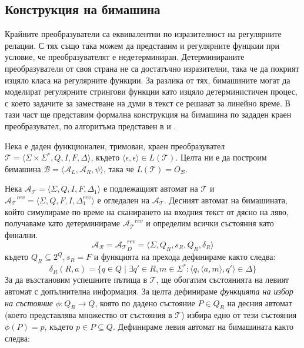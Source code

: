 \documentclass[12pt, oneside]{article}
\theoremstyle{definition}
\begin{document}
\subsection{Конструкция на бимашина}

Крайните преобразуватели са еквивалентни по изразителност на регулярните релации. С тях също така можем да представим и регулярните фунцкии при условие, че преобразувателят е недетерминиран. Детерминираните преобразуватели от своя страна не са достатъчно изразителни, така че да покрият изцяло класа на регулярните функции. За разлика от тях, бимашините могат да моделират регулярните стрингови функции \cite{Schutzenberger:61} като изцяло детерминистичен процес, с което задачите за заместване на думи в текст се решават за линейно време. В тази част ще представим формална конструкция на бимашина по зададен краен преобразувател, по алгоритъма представен в \cite{GerdjikovEtAl:2017} и \cite{Mihov:2018-2}.

Нека е даден функционален, тримован, краен преобразувател \( \mathcal{T} = \langle \Sigma \times \Sigma^*, Q, I, F, \Delta \rangle \), където \( \langle \epsilon, \epsilon \rangle \in L(\mathcal{T}) \). Целта ни е да построим бимашина \( \mathcal{B} = \langle \mathcal{A}_L, \mathcal{A}_R, \psi \rangle \), така че \( L(\mathcal{T}) = O_\mathcal{B} \).

Нека \( \mathcal{A_T} = \langle \Sigma, Q, I, F, \Delta_1 \rangle \) е подлежащият автомат на \( \mathcal{T} \) и \( \mathcal{A_T}^{rev} = \langle \Sigma, Q, F, I, \Delta_1^{rev} \rangle \) е огледален на \( \mathcal{A_T} \). Десният автомат на бимашината, който симулираме по време на сканирането на входния текст от дясно на ляво, получаваме като детерминираме \( \mathcal{A_T}^{rev} \) и определим всички състояния като финални.
\[ \mathcal{A_R} = \mathcal{A_T}^{rev}_D = \langle \Sigma, Q_R, s_R, Q_R, \delta_R \rangle \]
където \( Q_R \subseteq 2^Q, s_R = F \) и функцията на прехода дефинираме както следва:
\[ \delta_R(R,a) = \{ q \in Q \mid \exists q' \in R, m \in \Sigma^* : \langle q, \langle a, m \rangle, q' \rangle \in \Delta \} \]
За да възстановим успешните пътища в \(\mathcal{T}\), ще обогатим състоянията на левият автомат с допълнителна информация. За целта дефинираме \emph{функцията на избор на състояние} \( \phi: Q_R \to Q \), която по дадено състояние \(P \in Q_R \) на десния автомат (което представлява множество от състояния в \(\mathcal{T}\)) избира едно от тези състояния \( \phi(P) = p \text{, където } p \in P \subseteq Q \). Дефинираме левия автомат на бимашината както следва:
\end{document}
